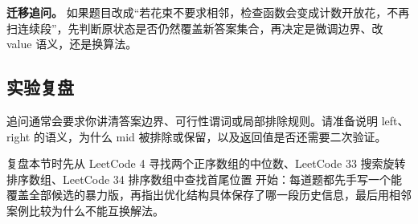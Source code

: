 \textbf{迁移追问。} 如果题目改成“若花束不要求相邻，检查函数会变成计数开放花，不再扫连续段”，先判断原状态是否仍然覆盖新答案集合，再决定是微调边界、改 value 语义，还是换算法。

\subsection{实验复盘}

追问通常会要求你讲清答案边界、可行性谓词或局部排除规则。请准备说明 left、right 的语义，为什么 mid 被排除或保留，以及返回值是否还需要二次验证。

复盘本节时先从 LeetCode 4 寻找两个正序数组的中位数、LeetCode 33 搜索旋转排序数组、LeetCode 34 排序数组中查找首尾位置 开始：每道题都先手写一个能覆盖全部候选的暴力版，再指出优化结构具体保存了哪一段历史信息，最后用相邻案例比较为什么不能互换解法。
